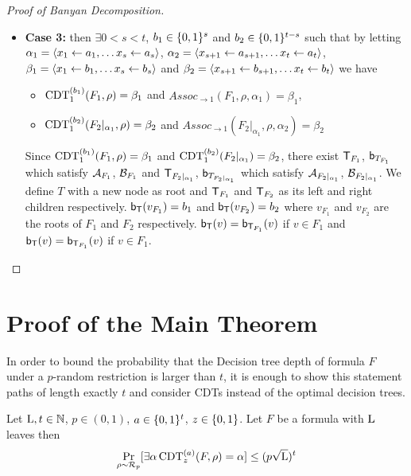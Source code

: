 \begin{proof}[Proof of Banyan Decomposition]
\begin{itemize}
    \item \textbf{Case 3:} then $\exists 0< s < t$, $b_1 \in \{0,1\}^s$ and $b_2 \in \{0,1\}^{t-s}$ such that by letting $\alpha_1 = \left\langle x_1 \gets a_1, \dots x_s \gets a_s \right\rangle$, $\alpha_2 = \left\langle x_{s+1} \gets a_{s+1}, \dots x_t \gets a_t \right\rangle$, $\beta_1= \left\langle x_1 \gets b_1, \dots x_s \gets b_s  \right\rangle$ and $\beta_2 = \left\langle x_{s+1} \gets b_{s+1}, \dots x_t \gets b_t \right\rangle$ we have
    \begin{itemize}
        \item $\operatorname{CDT}^{(b_1)}_1(F_1,\rho) = \beta_1$ and $Assoc_{\to 1}(F_1,\rho,\alpha_1)=\beta_1$,
        \item $\operatorname{CDT}^{(b_2)}_1(F_2|_{\alpha_1},\rho) = \beta_2$ and $Assoc_{\to 1}(F_2|_{\alpha_1},\rho,\alpha_2)=\beta_2$                
    \end{itemize}
    Since $\operatorname{CDT}_1^{(b_1)}(F_1,\rho) = \beta_1$ and $\operatorname{CDT}_1^{(b_2)}(F_2|_{\alpha_1}) = \beta_2$, there exist $\mathsf{T}_{F_1}$, $\mathsf{b}_{T_{F_1}}$ which satisfy $\mathcal{A}_{F_1}$, $\mathcal{B}_{F_1}$ and  $\mathsf{T}_{F_2|_{\alpha_1}}$, $\mathsf{b}_{T_{F_2|_{\alpha_1}}}$ which satisfy $\mathcal{A}_{F_2|_{\alpha_1}}$, $\mathcal{B}_{F_2|_{\alpha_1}}$. We define $T$ with a new node as root and $\mathsf{T}_{F_1}$ and $\mathsf{T}_{F_2}$ as its left and right children respectively.  
    $\mathsf{b}_{\mathsf{T}}(v_{F_1}) = b_1$ and $\mathsf{b}_{\mathsf{T}}(v_{F_2}) = b_2$ where $v_{F_1}$ and $v_{F_2}$ are the roots of $F_1$ and $F_2$ respectively. 
    $\mathsf{b_T}(v) = \mathsf{b}_{\mathsf{T}_{F_1}}(v)$ if $v \in F_1$ and $\mathsf{b_T}(v) = \mathsf{b}_{\mathsf{T}_{F_1}}(v)$ if $v \in F_1$.
\end{itemize}

\end{proof}

\section{Proof of the Main Theorem}
\label{sec:proof-main-theorem}

In order to bound the probability that the Decision tree depth of \demorgan formula $F$ under a $p$-random restriction is larger than $t$, it is enough to show this statement paths of length exactly $t$ and consider CDTs instead of the optimal decision trees. 



\begin{theorem}
\label{thm: intermediate}
    Let $\mathrm{L},t \in \mathbb{N}$, $p \in (0,1)$, $a \in \{0,1\}^t$, $z \in \{0,1\}$. Let $F$ be a \demorgan formula with $\mathrm{L}$ leaves then   
    $$\Pr_{\rho \sim \mathbf{\mathcal{R}}_p}[\exists \alpha \operatorname{CDT}_z^{(a)}(F,\rho) = \alpha] \le (p \sqrt{\mathrm{L}})^t$$
\end{theorem}

